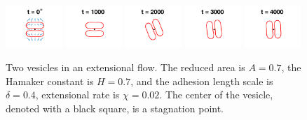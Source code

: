 \documentclass[prf,superscriptaddress,showpacs]{revtex4-1}
\begin{document}
\begin{figure}[htp]
  \includegraphics[width = 0.19\textwidth,trim={5cm 2cm 5cm 1cm},clip]{figs/extensional_adR4em1adS7em1Chi2em2_ra070_image01.png}
  \includegraphics[width = 0.19\textwidth,trim={5cm 2cm 5cm 1cm},clip]{figs/extensional_adR4em1adS7em1Chi2em2_ra070_image02.png}
  \includegraphics[width = 0.19\textwidth,trim={5cm 2cm 5cm 1cm},clip]{figs/extensional_adR4em1adS7em1Chi2em2_ra070_image03.png}
  \includegraphics[width = 0.19\textwidth,trim={5cm 2cm 5cm 1cm},clip]{figs/extensional_adR4em1adS7em1Chi2em2_ra070_image04.png}
  \includegraphics[width = 0.19\textwidth,trim={5cm 2cm 5cm 1cm},clip]{figs/extensional_adR4em1adS7em1Chi2em2_ra070_image05.png}
  \caption{\label{fig:extensional1} Two vesicles in an extensional flow.
  The reduced area is $A = 0.7$, the Hamaker constant is $H = 0.7$, and
  the adhesion length scale is $\delta = 0.4$, extensional rate is $\chi
  = 0.02$.  The center of the vesicle, denoted with a black square, is a
  stagnation point.}
\end{figure}
\end{document}
